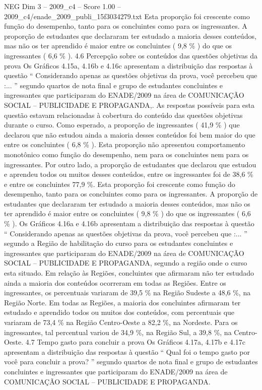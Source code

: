 \begin{textsample}{NEG Dim 3 – 2009\_c4 – Score 1.00 – 2009\_c4/enade\_2009\_publi\_15f3034279.txt}
Esta proporção foi crescente como função do desempenho, tanto para os concluintes como para os ingressantes.
A proporção de estudantes que declararam ter estudado a maioria desses conteúdos, mas não os ter aprendido é maior entre os concluintes ( 9,8 \% ) do que os ingressantes ( 6,6 \% ). 4.6 Percepção sobre os conteúdos das questões objetivas da prova Os Gráficos 4.15a, 4.16b e 4.16c apresentam a distribuição das respostas à questão “ Considerando apenas as questões objetivas da prova, você percebeu que :... ” segundo quartos de nota final e grupo de estudantes concluintes e ingressantes que participaram do ENADE/2009 na área de COMUNICAÇÃO SOCIAL – PUBLICIDADE E PROPAGANDA,.
As respostas possíveis para esta questão estavam relacionadas à cobertura do conteúdo das questões objetivas durante o curso.
Como esperado, a proporção de ingressantes ( 41,9 \% ) que declarou que não estudou ainda a maioria desses conteúdos foi bem maior do que entre os concluintes ( 6,8 \% ).
Esta proporção não apresentou comportamento monotônico como função do desempenho, nem para os concluintes nem para os ingressantes.
Por outro lado, a proporção de estudantes que declarou que estudou e aprendeu todos ou muitos desses conteúdos, entre os ingressantes foi de 38,6 \% e entre os concluintes 77,9 \%.
Esta proporção foi crescente como função do desempenho, tanto para os concluintes como para os ingressantes.
A proporção de estudantes que declararam ter estudado a maioria desses conteúdos, mas não os ter aprendido é maior entre os concluintes ( 9,8 \% ) do que os ingressantes ( 6,6 \% ).
Os Gráficos 4.16a e 4.16b apresentam a distribuição das respostas à questão “ Considerando apenas as questões objetivas da prova, você percebeu que :... ” segundo a Região de habilitação do curso para os estudantes concluintes e ingressantes que participaram do ENADE/2009 na área de COMUNICAÇÃO SOCIAL – PUBLICIDADE E PROPAGANDA, segundo a região onde o curso esta situado.
Em relação às Regiões, concluintes que afirmaram não ter estudado ainda a maioria dos conteúdos ocorreram em todas as Regiões.
Entre os ingressantes, os percentuais variaram de 39,5 \% na Região Sudeste a 48,6 \%, na Região Norte.
Em todas as Regiões, a maioria dos concluintes afirmaram ter estudado e aprendido todos ou muitos dos conteúdos, com percentuais que variaram de 73,4 \% na Região Centro-Oeste a 82,2 \%, na Nordeste.
Para os ingressantes, tal percentual variou de 34,9 \%, na Região Sul, a 39,8 \%, na Centro-Oeste. 4.7 Tempo gasto para concluir a prova Os Gráficos 4.17a, 4.17b e 4.17c apresentam a distribuição das respostas à questão “ Qual foi o tempo gasto por você para concluir a prova? ” segundo quartos de nota final e grupo de estudantes concluintes e ingressantes que participaram do ENADE/2009 na área de COMUNICAÇÃO SOCIAL – PUBLICIDADE E PROPAGANDA.

\end{textsample}
